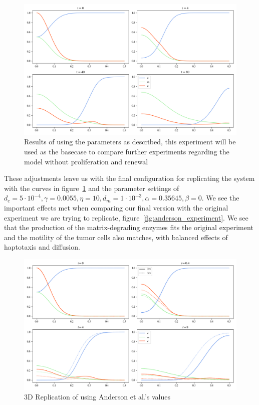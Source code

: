 \begin{figure}[h]
 \centering
 \includegraphics[width=\textwidth]{resources/images/basecase_without_proliferation_.png}
 \caption{Results of using the parameters as described, this experiment will be used as the basecase to compare further experiments regarding the model without proliferation and renewal}
 \label{fig:basecase_without_proliferation}
\end{figure}
These adjustments leave us with the final configuration for replicating the system with the curves in figure~\ref{fig:basecase_without_proliferation} and the parameter settings of $d_c=5\cdot 10^{-4}, \gamma=0.0055, \eta=10, d_m=1\cdot 10^{-3}, \alpha=0.35645, \beta=0$. We see the important effects met when comparing our final version with the original experiment we are trying to replicate, figure~\ref{fig:anderson_experiment}. We see that the production of the matrix-degrading enzymes fits the original experiment and the motility of the tumor cells also matches, with balanced effects of haptotaxis and diffusion.


\begin{figure}[h]
    \centering
    \includegraphics[width=\textwidth]{resources/images/1D_replication_3D.png}
    \caption{3D Replication of using Anderson et al.'s values}
    \label{fig:1D_replication_3D}
\end{figure}

